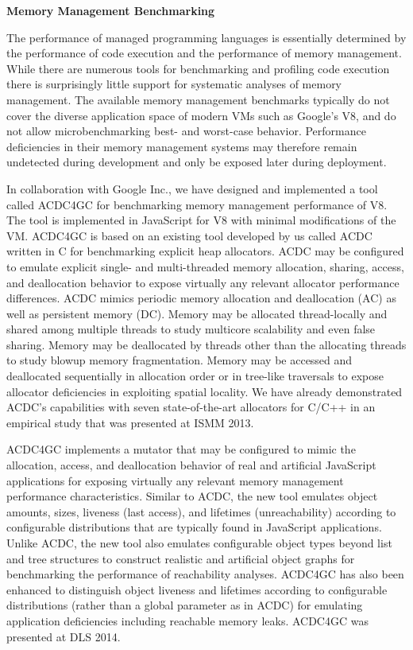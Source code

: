 {\bf{Memory Management Benchmarking}}

The performance of managed programming languages is essentially determined by the performance of code execution and the performance of memory management. While there are numerous tools for benchmarking and profiling code execution there is surprisingly little support for systematic analyses of memory management. The available memory management benchmarks typically do not cover the diverse application space of modern VMs such as Google's V8, and do not allow microbenchmarking best- and worst-case behavior. Performance deficiencies in their memory management systems may therefore remain undetected during development and only be exposed later during deployment.

In collaboration with Google Inc., we have designed and implemented a tool called ACDC4GC for benchmarking memory management performance of V8. The tool is implemented in JavaScript for V8 with minimal modifications of the VM. ACDC4GC is based on an existing tool developed by us called ACDC written in C for benchmarking explicit heap allocators. ACDC may be configured to emulate explicit single- and multi-threaded memory allocation, sharing, access, and deallocation behavior to expose virtually any relevant allocator performance differences. ACDC mimics periodic memory allocation and deallocation (AC) as well as persistent memory (DC). Memory may be allocated thread-locally and shared among multiple threads to study multicore scalability and even false sharing. Memory may be deallocated by threads other than the allocating threads to study blowup memory fragmentation. Memory may be accessed and deallocated sequentially in allocation order or in tree-like traversals to expose allocator deficiencies in exploiting spatial locality. We have already demonstrated ACDC’s capabilities with seven state-of-the-art allocators for C/C++ in an empirical study that was presented at ISMM 2013.

ACDC4GC implements a mutator that may be configured to mimic the allocation, access, and deallocation behavior of real and artificial JavaScript applications for exposing virtually any relevant memory management performance characteristics. Similar to ACDC, the new tool emulates object amounts, sizes, liveness (last access), and lifetimes (unreachability) according to configurable distributions that are typically found in JavaScript applications. Unlike ACDC, the new tool also emulates configurable object types beyond list and tree structures to construct realistic and artificial object graphs for benchmarking the performance of reachability analyses. ACDC4GC has also been enhanced to distinguish object liveness and lifetimes according to configurable distributions (rather than a global parameter as in ACDC) for emulating application deficiencies including reachable memory leaks. ACDC4GC was presented at DLS 2014.
